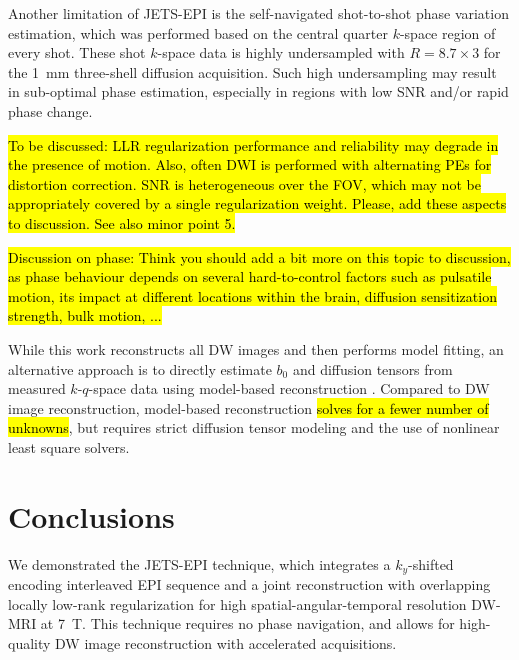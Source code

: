 \documentclass[preprint,12pt,authoryear,review]{elsarticle}
\begin{document}
    Another limitation of JETS-EPI is the self-navigated shot-to-shot phase variation estimation,
    which was performed based on the central quarter $k$-space region of every shot.
    These shot $k$-space data is highly undersampled with $R = 8.7 \times 3$
    for the \SI{1}{mm} three-shell diffusion acquisition.
    Such high undersampling may result in sub-optimal phase estimation,
    especially in regions with low SNR and/or rapid phase change.

    \hl{To be discussed: LLR regularization performance and reliability may degrade in the presence of motion. Also, often DWI is performed with alternating PEs for distortion correction. SNR is heterogeneous over the FOV, which may not be appropriately covered by a single regularization weight. Please, add these aspects to discussion. See also minor point 5.}

    \hl{Discussion on phase: Think you should add a bit more on this topic to discussion, as phase behaviour depends on several hard-to-control factors such as pulsatile motion, its impact at different locations within the brain, diffusion sensitization strength, bulk motion, ...}



    While this work reconstructs all DW images and then performs model fitting,
    an alternative approach is to directly estimate $b_0$ and diffusion tensors
    from measured $k$-$q$-space data using model-based reconstruction
    \citep{knoll_2015_mobadiff,dong_2018_mobadiff,shafieizargar_2023_adept}.
    Compared to DW image reconstruction,
    model-based reconstruction \hl{solves for a fewer number of unknowns}, 
    but requires strict diffusion tensor modeling and the use of nonlinear least square solvers.

    \section{Conclusions}
    \label{SEC:Conc}

    We demonstrated the JETS-EPI technique, which integrates
    a $k_y$-shifted encoding interleaved EPI sequence and
    a joint reconstruction with overlapping locally low-rank regularization
    for high spatial-angular-temporal resolution DW-MRI at \SI{7}{\tesla}.
    This technique requires no phase navigation,
    and allows for high-quality DW image reconstruction with accelerated acquisitions.
\end{document}
